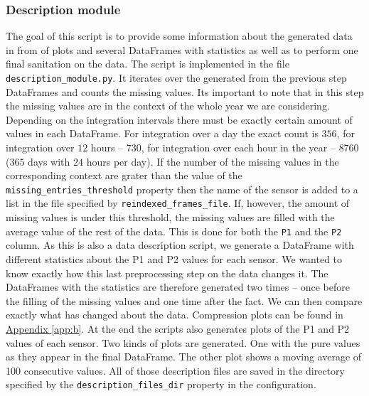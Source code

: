 \documentclass[12pt,a4paper,twoside]{scrartcl}
\numberwithin{equation}{section}
\newcommand{\refapp}[1]{\hyperref[#1]{Appendix \ref*{#1}}}
\begin{document}
\subsubsection{Description module}\label{sec:desc-module}
The goal of this script is to provide some information about the generated data in from of plots and several DataFrames with statistics as well as to perform one final sanitation on the data. The script is implemented in the file \texttt{description\_module.py}. It iterates over the generated from the previous step DataFrames and counts the missing values. Its important to note that in this step the missing values are in the context of the whole year we are considering. Depending on the integration intervals there must be exactly certain amount of values in each DataFrame. For integration over a day the exact count is \(356 \), for integration over \(12 \) hours -- \(730 \), for integration over each hour in the year -- \(8760 \) (\(365\) days with \(24\) hours per day). If the number of the missing values in the corresponding context are grater than the value of the \texttt{missing\_entries\_threshold} property then the name of the sensor is added to a list in the file specified by \texttt{reindexed\_frames\_file}. If, however, the amount of missing values is under this threshold, the missing values are filled with the average value of the rest of the data. This is done for both the \texttt{P1} and the \texttt{P2} column. As this is also a data description script, we generate a DataFrame with different statistics about the P1 and P2 values for each sensor. We wanted to know exactly how this last preprocessing step on the data changes it. The DataFrames with the statistics are therefore generated two times -- once before the filling of the missing values and one time after the fact. We can then compare exactly what has changed about the data. Compression plots can be found in \refapp{app:b}. At the end the scripts also generates plots of the P1 and P2 values of each sensor. Two kinds of plots are generated. One with the pure values as they appear in the final DataFrame. The other plot shows a moving average of 100 consecutive values. All of those description files are saved in the directory specified by the \texttt{description\_files\_dir} property in the configuration.
\end{document}
